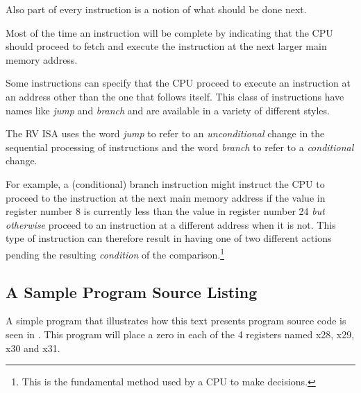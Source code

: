 Also part of every instruction is a notion of what should be done next.

Most of the time an instruction will be complete by indicating that
the CPU should proceed to fetch and execute the instruction at the next
larger main memory address.

Some instructions can specify that the CPU proceed to execute an
instruction at an address other than the one that follows itself.
This class of instructions have names like {\em jump} and {\em branch}
and are available in a variety of different styles.

The RV ISA uses the word {\em jump} to refer to an {\em unconditional}
change in the sequential processing of instructions and the word
{\em branch} to refer to a {\em conditional} change.

For example, a (conditional) branch instruction might instruct the CPU 
to proceed to the instruction at the next main memory address if the value 
in register number 8 is currently less than the value in register number 
24 {\em but otherwise} proceed to an instruction at a different address
when it is not.  This type of instruction can therefore result in having 
one of two different actions pending the resulting {\em condition} of 
the comparison.\footnote{This is the fundamental method used by a CPU 
to make decisions.}


\subsection{A Sample Program Source Listing}

A simple program that illustrates how this text presents 
program source code is seen in .
This program will place a zero in each of the 4 registers 
named x28, x29, x30 and x31.


